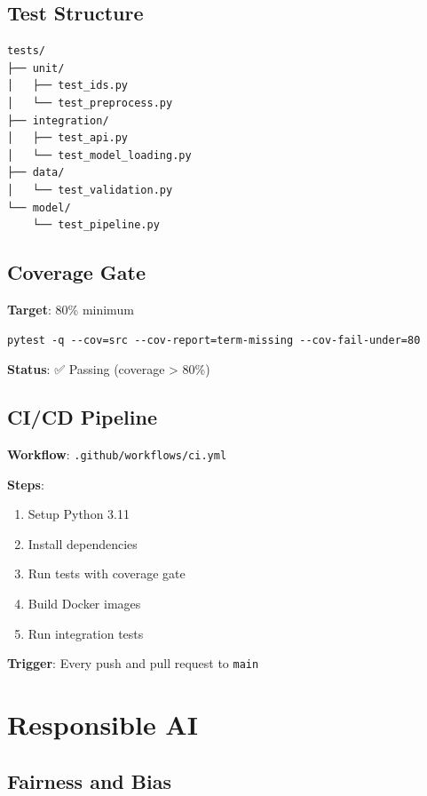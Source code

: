 \documentclass[12pt,a4paper]{article}
\newcommand{\code}[1]{\texttt{#1}}
\begin{document}
\subsection{Test Structure}

\begin{lstlisting}
tests/
├── unit/
│   ├── test_ids.py
│   └── test_preprocess.py
├── integration/
│   ├── test_api.py
│   └── test_model_loading.py
├── data/
│   └── test_validation.py
└── model/
    └── test_pipeline.py
\end{lstlisting}

\subsection{Coverage Gate}

\textbf{Target}: 80\% minimum

\begin{lstlisting}
pytest -q --cov=src --cov-report=term-missing --cov-fail-under=80
\end{lstlisting}

\textbf{Status}: ✅ Passing (coverage > 80\%)

\subsection{CI/CD Pipeline}

\textbf{Workflow}: \code{.github/workflows/ci.yml}

\textbf{Steps}:
\begin{enumerate}
    \item Setup Python 3.11
    \item Install dependencies
    \item Run tests with coverage gate
    \item Build Docker images
    \item Run integration tests
\end{enumerate}

\textbf{Trigger}: Every push and pull request to \code{main}

\section{Responsible AI}

\subsection{Fairness and Bias}
\end{document}
